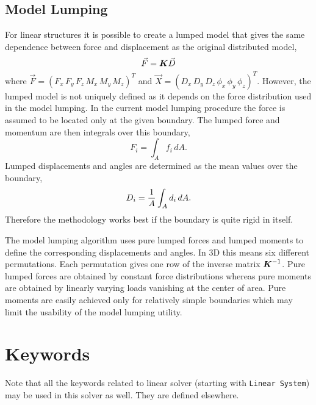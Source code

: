 \subsection{Model Lumping}

For linear structures it is possible to create a lumped model that gives the same
dependence between force and displacement as the original distributed model,
\begin{equation}
  \Vec{F} = {\mbox{\boldmath{${K}$}}} \Vec{D}
\end{equation}
where $\Vec{F}=(F_x\,F_y\,F_z\,M_x\,M_y\,M_z)^T$ and 
$\Vec{X} = (D_x\,D_y\,D_z\,\phi_x\,\phi_y\,\phi_z)^T$. 
However, the lumped model is not uniquely defined as it depends on the force distribution
used in the model lumping. In the current model lumping procedure the 
force is assumed to be located only at the given boundary. The lumped force and momentum are
then integrals over this boundary,
\begin{equation}
  F_i = \int_A f_i \, dA .
\end{equation}
Lumped displacements and angles are determined
as the mean values over the boundary, 
\begin{equation}
  D_i = \frac{1}{A} \int_A d_i \, dA.
\end{equation}
Therefore the methodology works best if the 
boundary is quite rigid in itself. 

The model lumping algorithm uses 
pure lumped forces and lumped moments to define the corresponding
displacements and angles. In 3D this means six different permutations. 
Each permutation gives one row of the inverse matrix ${\mbox{\boldmath{${K}$}}}^{-1}$.
Pure lumped forces are obtained by constant force distributions whereas
pure moments are obtained by linearly varying loads vanishing at the 
center of area. Pure moments are easily achieved only for relatively simple 
boundaries which may limit the usability of the model lumping utility.


\section{Keywords} 

\sifbegin

Note that all the keywords related to linear solver (starting
with {\tt Linear System})
may be used in this solver as well.  They are defined elsewhere. 

